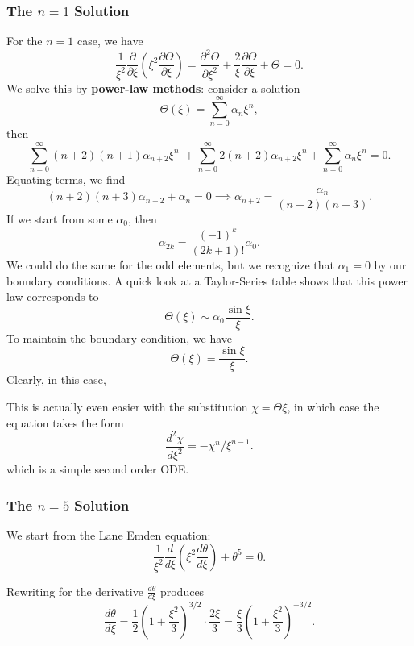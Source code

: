 \subsubsection{The $n=1$ Solution}

For the $n=1$ case, we have 
\[
\frac{1}{\xi^2} \frac{\partial }{\partial \xi}\left(\xi^2 \frac{\partial \Theta}{\partial \xi}\right) = \frac{\partial^2 \Theta}{\partial \xi^2} + \frac{2}{\xi} \frac{\partial \Theta}{\partial \xi} + \Theta = 0.
\]
We solve this by \textbf{power-law methods}: consider a solution
\[
\Theta(\xi) = \sum_{n=0}^\infty \alpha_n \xi^n,
\]
then
\[
\sum_{n=0}^\infty (n+2)(n+1) \alpha_{n+2} \xi^{n} \;+ \sum_{n=0}^\infty 2(n+2) \alpha_{n+2} \xi^n + \sum_{n=0}^\infty \alpha_n \xi^n = 0.
\]
Equating terms, we find
\[
(n+2)(n+3) \alpha_{n+2} + \alpha_n = 0 \implies \alpha_{n+2} = \frac{\alpha_n}{(n+2)(n+3)}.
\]
If we start from some $\alpha_0$, then
\[
\alpha_{2k} = \frac{(-1)^k}{(2k +1)!}\alpha_0.
\]
We could do the same for the odd elements, but we recognize that $\alpha_1 = 0$ by our boundary conditions. A quick look at a Taylor-Series table shows that this power law corresponds to 
\[
\Theta(\xi) \sim \alpha_0 \frac{\sin \xi}{\xi}.
\]
To maintain the boundary condition, we have
\begin{equation}
    \Theta(\xi) = \frac{\sin \xi}{\xi}.
\end{equation}
Clearly, in this case, 
\begin{remark}
    This is actually even easier with the substitution $\chi = \Theta \xi$, in which case the equation takes the form
    \[
    \frac{d^2\chi}{d\xi^2} = - \chi^n/\xi^{n-1}.
    \]
    which is a simple second order ODE.
\end{remark}

\subsubsection{The $n=5$ Solution}

We start from the Lane Emden equation:
\begin{equation}
    \frac{1}{\xi^{2}} \frac{d}{d\xi} \left(\xi^{2} \frac{d\theta}{d\xi}\right) + \theta^{5} = 0.
\end{equation}

Rewriting for the derivative $\tfrac{d\theta}{d\xi}$ produces
\begin{equation}
    \frac{d\theta}{d\xi} 
    = \frac{1}{2}\left(1+\frac{\xi^{2}}{3}\right)^{3/2} \cdot \frac{2\xi}{3}
    = \frac{\xi}{3}\left(1+\frac{\xi^{2}}{3}\right)^{-3/2}.
\end{equation}

